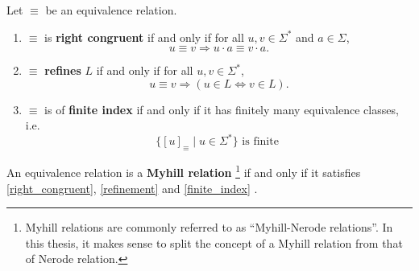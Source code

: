 \begin{definition} Let $\equiv$ be an equivalence relation. 

\begin{enumerate}[label=(\roman*)]

    \item\label{right_congruent}
        $\equiv$ is \textbf{right congruent} if and only if for all $u, v \in \Sigma^*$ and $a \in \Sigma$,
        \begin{equation*}
            u \equiv v \Rightarrow
            u \cdot a \equiv v \cdot a.
        \end{equation*}


    \item\label{refinement}
        $\equiv$ \textbf{refines} $L$ if and only if for all $u,v \in \Sigma^*$,
        \begin{equation*}
            u \equiv v \Rightarrow
            (u \in L \iff v \in L).
        \end{equation*}

    \item\label{finite_index}
        $\equiv$ is of \textbf{finite index} if and only if it has finitely many equivalence classes, i.e.
        \begin{equation*}
            \{[u]_\equiv \; | \; u \in \Sigma^*\} \mbox{ is finite }
        \end{equation*}

\end{enumerate}
\end{definition}

\begin{definition}
    \label{Myhill_Rel}
    An equivalence relation is a \textbf{Myhill relation}%
    \footnote{Myhill relations are commonly referred to as ``Myhill-Nerode relations''. 
    In this thesis, it makes sense to split the concept of a Myhill relation from that of Nerode relation.}
    if and only if it satisfies \ref{right_congruent}, \ref{refinement} and \ref{finite_index} \cite{DBLP:books/daglib/0088160}.
\end{definition}

